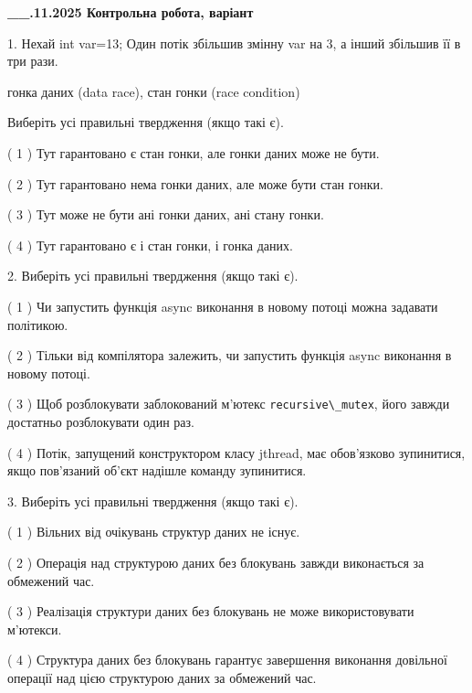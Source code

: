 \documentclass[12pt, ukrainian]{article}
\def\code#1{\Verb!#1!}
\begin{document}
\newpage
\begin {large}

\textbf{\_\_.11.2025 Контрольна робота, варіант  }\par


{
1. Нехай int var=13; Один потік збільшив змінну var на 3, а інший збільшив її в три рази.

гонка даних (data race), стан гонки (race condition)

Виберіть усі правильні твердження (якщо такі є).\par
\vspace{2mm}
( 1 ) Тут гарантовано є стан гонки, але гонки даних може не бути.%

( 2 ) Тут гарантовано нема гонки даних, але може бути стан гонки.%

( 3 ) Тут може не бути ані гонки даних, ані стану гонки.%

( 4 ) Тут гарантовано є і стан гонки, і гонка даних.%


2. Виберіть усі правильні твердження (якщо такі є).\par
\vspace{2mm}

( 1 ) Чи запустить функція  async виконання в новому потоці можна задавати політикою.%

( 2 ) Тільки від компілятора залежить, чи запустить функція async виконання в новому потоці.%

( 3 ) Щоб розблокувати заблокований м’ютекс \code{recursive\_mutex}, його завжди достатньо розблокувати один раз.%

( 4 ) Потік, запущений конструктором класу jthread, має обов’язково зупинитися, якщо пов’язаний об’єкт надішле команду зупинитися.%


3. Виберіть усі правильні твердження (якщо такі є).\par
\vspace{2mm}

( 1 ) Вільних від очікувань структур даних не існує.%

( 2 ) Операція над структурою даних без блокувань завжди виконається за обмежений час.%

( 3 ) Реалізація структури даних без блокувань не може використовувати м’ютекси.%

( 4 ) Структура даних без блокувань гарантує завершення виконання довільної операції над цією структурою даних за обмежений час.%


}
\end{large}
\end{document}

